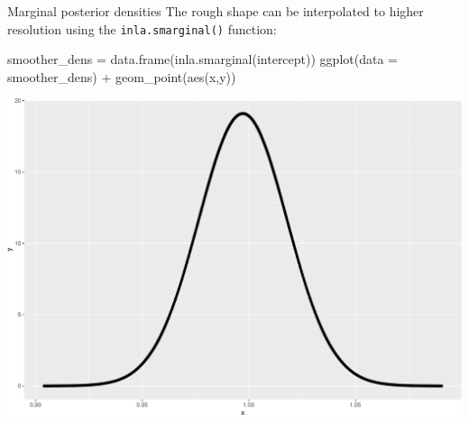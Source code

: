 \documentclass[
  ignorenonframetext,
]{beamer}
\newenvironment{Shaded}{\begin{snugshade}}{\end{snugshade}}
\newcommand{\AttributeTok}[1]{\textcolor[rgb]{0.77,0.63,0.00}{#1}}
\newcommand{\FunctionTok}[1]{\textcolor[rgb]{0.00,0.00,0.00}{#1}}
\newcommand{\NormalTok}[1]{#1}
\newcommand{\OtherTok}[1]{\textcolor[rgb]{0.56,0.35,0.01}{#1}}
\newcommand{\SpecialCharTok}[1]{\textcolor[rgb]{0.00,0.00,0.00}{#1}}
\begin{document}
\begin{frame}[fragile]{Marginal posterior densities}
\protect\hypertarget{marginal-posterior-densities-1}{}
The rough shape can be interpolated to higher resolution using the
\texttt{inla.smarginal()} function:

\begin{Shaded}
\begin{Highlighting}[]
\NormalTok{smoother\_dens }\OtherTok{=} \FunctionTok{data.frame}\NormalTok{(}\FunctionTok{inla.smarginal}\NormalTok{(intercept))}
\FunctionTok{ggplot}\NormalTok{(}\AttributeTok{data =}\NormalTok{ smoother\_dens) }\SpecialCharTok{+} \FunctionTok{geom\_point}\NormalTok{(}\FunctionTok{aes}\NormalTok{(x,y))}
\end{Highlighting}
\end{Shaded}

\begin{center}\includegraphics[width=0.6\linewidth]{Part3_RINLA_files/figure-beamer/unnamed-chunk-25-1} \end{center}
\end{frame}
\end{document}
